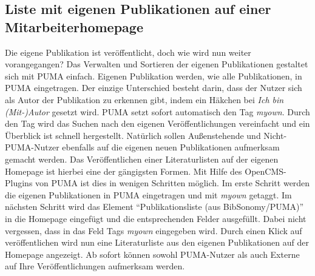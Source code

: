 \documentclass[b5paper,11pt,twoside]{scrbook} %
\begin{document}
\subsection{Liste mit eigenen Publikationen auf einer Mitarbeiterhomepage}
Die eigene Publikation ist veröffentlicht, doch wie wird nun weiter vorangegangen? \newline Das Verwalten und Sortieren der eigenen Publikationen gestaltet sich mit PUMA einfach. Eigenen  Publikation werden, wie alle Publikationen, in PUMA eingetragen. Der einzige Unterschied besteht darin, dass der Nutzer sich als Autor der Publikation zu erkennen gibt, indem ein Häkchen bei \textit{Ich bin (Mit-)Autor} gesetzt wird. PUMA setzt sofort automatisch den Tag \textit{myown}. Durch den Tag wird das Suchen nach den eigenen Veröffentlichungen vereinfacht und ein Überblick ist schnell hergestellt.\newline
Natürlich sollen Außenstehende und Nicht-PUMA-Nutzer ebenfalls auf die eigenen neuen Publikationen aufmerksam gemacht werden. Das Veröffentlichen einer Literaturlisten auf der eigenen Homepage ist hierbei eine der gängigsten Formen. Mit Hilfe des OpenCMS-Plugins von PUMA ist dies in wenigen Schritten möglich. Im erste Schritt werden die eigenen Publikationen in PUMA eingetragen und mit \textit{myown} getaggt. Im nächsten Schritt wird das Element \enquote{Publikationsliste (aus BibSonomy/PUMA)} in die Homepage eingefügt und die  entsprechenden Felder ausgefüllt. Dabei nicht vergessen, dass in das Feld Tags \textit{myown} eingegeben wird. Durch einen Klick auf veröffentlichen wird nun eine Literaturliste aus den eigenen Publikationen auf der Homepage angezeigt.  
Ab sofort können sowohl PUMA-Nutzer als auch Externe auf Ihre Veröffentlichungen aufmerksam werden.
\end{document}
